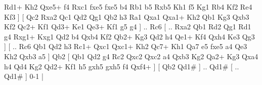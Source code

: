 Rd1+  Kh2 Qxe5+  f4 Rxc1  fxe5 fxe5  b4 Rb1  b5 Rxb5  Kh1 f5  Kg1 Rb4  Kf2 Re4  Kf3   ]  [  Qc2 Rxa2  Qc1 Qd2  Qg1 Qb2  h3 Ra1  Qxa1 Qxa1+  Kh2 Qb1  Kg3 Qxb3  Kf2 Qc2+  Kf1 Qd3+  Ke1 Qe3+  Kf1 g5  g4   ] .. Rc6 [ .. Rxa2  Qb1 Rd2  Qg1 Rd1  g4 Rxg1+  Kxg1 Qd2  b4 Qxb4  Kf2 Qb2+  Kg3 Qd2  h4 Qe1+  Kf4 Qxh4  Ke3 Qg3   ]  [ .. Rc6  Qb1 Qd2  h3 Rc1+  Qxc1 Qxc1+  Kh2 Qc7+  Kh1 Qa7  e5 fxe5  a4 Qe3  Kh2 Qxb3  a5   ]  Qb2 [  Qb1 Qd2  g4 Rc2  Qxc2 Qxc2  a4 Qxb3  Kg2 Qa2+  Kg3 Qxa4  h4 Qd4  Kg2 Qd2+  Kf1 h5  gxh5 gxh5  f4 Qxf4+   ]  [  Qb2 Qd1#   ] .. Qd1#    [ .. Qd1#   ] 0-1  |
